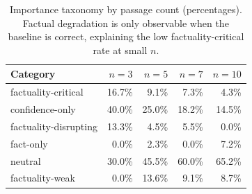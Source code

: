 \begin{table}[h]
\centering\small
\begin{tabular}{lrrrr}
\toprule
Category & $n=3$ & $n=5$ & $n=7$ & $n=10$ \\
\midrule
  factuality-critical & 16.7\% & 9.1\% & 7.3\% & 4.3\% \\
  confidence-only & 40.0\% & 25.0\% & 18.2\% & 14.5\% \\
  factuality-disrupting & 13.3\% & 4.5\% & 5.5\% & 0.0\% \\
  fact-only & 0.0\% & 2.3\% & 0.0\% & 7.2\% \\
  neutral & 30.0\% & 45.5\% & 60.0\% & 65.2\% \\
  factuality-weak & 0.0\% & 13.6\% & 9.1\% & 8.7\% \\
\bottomrule
\end{tabular}
\caption{Importance taxonomy by passage count (percentages). Factual degradation is only observable when the baseline is correct, explaining the low factuality-critical rate at small $n$.}
\label{tab:e2_taxonomy_by_passage_num}
\end{table}
